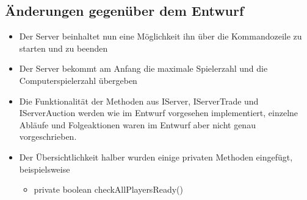 \documentclass[a4paper,10pt]{article}
\begin{document}
\subsection {Änderungen gegenüber dem Entwurf}
\begin{itemize}
\item Der Server beinhaltet nun eine Möglichkeit ihn über die Kommandozeile zu starten und zu beenden
\item Der Server bekommt am Anfang die maximale Spielerzahl und die Computerspielerzahl übergeben
\item Die Funktionalität der Methoden aus IServer, IServerTrade und IServerAuction werden wie im Entwurf vorgesehen implementiert, einzelne Abläufe und Folgeaktionen waren im Entwurf aber nicht genau vorgeschrieben.
\item Der Übersichtlichkeit halber wurden einige privaten Methoden eingefügt, beispielsweise
\begin{itemize}
\item private boolean checkAllPlayersReady()
\end{itemize}
\end{itemize}
\end{document}
